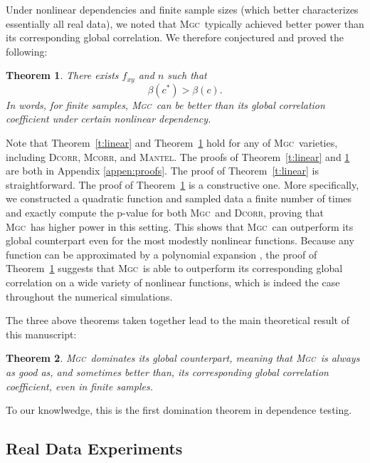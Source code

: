 \documentclass[11pt]{article}
\newcommand{\note}[2][]{\added[#1,remark={#2}]{}}
\providecommand{\sct}[1]{{\normalfont\textsc{#1}}}
\newcommand{\G}{c}
\newcommand{\Mgc}{\sct{Mgc}}
\newcommand{\Dcorr}{\sct{Dcorr}}
\newcommand{\Mcorr}{\sct{Mcorr}}
\newcommand{\Mantel}{\sct{Mantel}}
\newcommand{\cs}[1]{{\note{cs: #1}}}
\newtheorem{thm}{Theorem}
\begin{document}
Under nonlinear dependencies and finite sample sizes (which better characterizes essentially all real data), we noted that \Mgc~typically achieved better power than its corresponding global correlation. 
We therefore conjectured and proved the following:
\begin{thm}
\label{t:non}
There exists $f_{xy}$ and $n$ such that
\begin{equation}
\beta(\G^{*}) > \beta(\G).
\end{equation}
In words, for finite samples, \Mgc~can be better than its global correlation coefficient under certain nonlinear dependency.
\end{thm}
Note that Theorem~\ref{t:linear} and Theorem~\ref{t:non} hold for any of \Mgc~varieties, including  \Dcorr, \Mcorr, and \Mantel.
%
The proofs of Theorem~\ref{t:linear} and \ref{t:non} are both in Appendix \ref{appen:proofs}.  The proof of Theorem~\ref{t:linear} is straightforward.  The proof of Theorem~\ref{t:non} is a constructive one. More specifically, we constructed a quadratic function and sampled data a finite number of times and exactly compute the p-value for both \Mgc~and \Dcorr, proving that \Mgc~has higher power in this setting. This shows that \Mgc~can outperform its global counterpart even for the most modestly nonlinear functions.  Because any function can be approximated by a polynomial expansion \cite{RudinBook}, the proof of Theorem~\ref{t:non} suggests that \Mgc~is able to outperform its corresponding global correlation on a wide variety of nonlinear functions, which is indeed the case throughout the numerical simulations. %

The three above theorems taken together lead to the main theoretical result of this manuscript:
\begin{thm}
\Mgc~dominates its global counterpart, meaning that \Mgc~is always as good as, and sometimes better than, its corresponding global correlation coefficient, even in finite samples. 
\end{thm}

To our knowlwedge, this is the first domination theorem in dependence testing.
\cs{is that true?}


\subsection*{Real Data Experiments}
\label{numer3}
\end{document}
